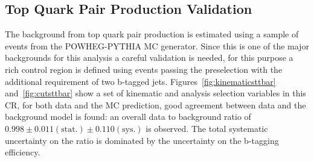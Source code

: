 \subsection{Top Quark Pair Production Validation}
\label{sec:top_est}

The background from top quark pair production is estimated using a sample of events from the POWHEG-PYTHIA MC
generator. Since this is one of the major backgrounds for this analysis a careful validation is needed, for this purpose
 a \ttbar rich control region is defined using events passing 
the preselection  with the additional requirement of two b-tagged jets.
Figures~\ref{fig:kinematicsttbar} and~\ref{fig:cutsttbar} show a set of kinematic and analysis selection
variables in this CR, for both data and the MC prediction,  good agreement between data and the background model is found:
an overall data to background ratio of $0.998 \pm 0.011\mathrm{(stat.)} \pm 0.110 \mathrm{(sys.)}$ is observed. 
The total systematic uncertainty on the ratio is dominated by the uncertainty on the b-tagging efficiency. 
%

